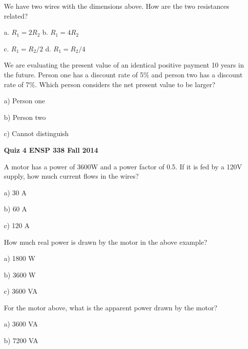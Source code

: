 \documentclass[12pt, oneside]{article}
\begin{document}
We have two wires with the dimensions above.
How are the two resistances related?

a. $R_1 = 2 R_2$ \hfill b. $R_1 = 4 R_2$

c. $R_1 = R_2 / 2 $ \hfill d. $R_1 = R_2 / 4 $


\problem{}
We are evaluating the present value of an identical positive payment 10 years in the
future.  Person one has a discount rate of 5\% and person two has a
discount rate of 7\%.  Which person considers the net present value to
be larger?

a) Person one

b) Person two

c) Cannot distinguish

\newpage
\setcounter{problem}{0}
{\bf Quiz 4 \hfill ENSP 338 \hfill Fall 2014}


\problem{}

A motor has a power of 3600W and a power factor of 0.5.  If it is fed by
a 120V supply, how much current flows in the wires?

a) 30 A

b) 60 A

c) 120 A




\problem{}

How much real power is drawn by the motor in the above example?

a) 1800 W

b) 3600 W

c) 3600 VA


\problem{}

For the motor above, what is the apparent power drawn by the motor?

a) 3600 VA

b) 7200 VA
\end{document}
